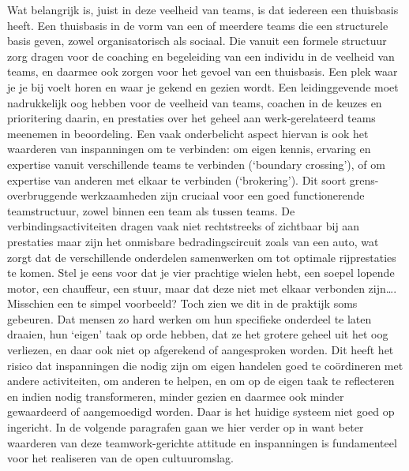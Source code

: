 \documentclass{jote-book}
\begin{document}
	Wat belangrijk is, juist in deze veelheid van teams, is dat iedereen een thuisbasis heeft. Een thuisbasis in de vorm van een of meerdere teams die een structurele basis geven, zowel organisatorisch als sociaal. Die vanuit een formele structuur zorg dragen voor de coaching en begeleiding van een individu in de veelheid van teams, en daarmee ook zorgen voor het gevoel van een thuisbasis. Een plek waar je je bij voelt horen en waar je gekend en gezien wordt. Een leidinggevende moet nadrukkelijk oog hebben voor de veelheid van teams, coachen in de keuzes en prioritering daarin, en prestaties over het geheel aan werk-gerelateerd teams meenemen in beoordeling. Een vaak onderbelicht aspect hiervan is ook het waarderen van inspanningen om te verbinden: om eigen kennis, ervaring en expertise vanuit verschillende teams te verbinden (‘boundary crossing'), of om expertise van anderen met elkaar te verbinden (‘brokering'). Dit soort grens-overbruggende werkzaamheden zijn cruciaal voor een goed functionerende teamstructuur, zowel binnen een team als tussen teams. De verbindingsactiviteiten dragen vaak niet rechtstreeks of zichtbaar bij aan prestaties maar zijn het onmisbare bedradingscircuit zoals van een auto, wat zorgt dat de verschillende onderdelen samenwerken om tot optimale rijprestaties te komen. Stel je eens voor dat je vier prachtige wielen hebt, een soepel lopende motor, een chauffeur, een stuur, maar dat deze niet met elkaar verbonden zijn…. Misschien een te simpel voorbeeld? Toch zien we dit in de praktijk soms gebeuren. Dat mensen zo hard werken om hun specifieke onderdeel te laten draaien, hun ‘eigen' taak op orde hebben, dat ze het grotere geheel uit het oog verliezen, en daar ook niet op afgerekend of aangesproken worden. Dit heeft het risico dat inspanningen die nodig zijn om eigen handelen goed te coördineren met andere activiteiten, om anderen te helpen, en om op de eigen taak te reflecteren en indien nodig transformeren, minder gezien en daarmee ook minder gewaardeerd of aangemoedigd worden. Daar is het huidige systeem niet goed op ingericht. In de volgende paragrafen gaan we hier verder op in want beter waarderen van deze teamwork-gerichte attitude en inspanningen is fundamenteel voor het realiseren van de open cultuuromslag.
\end{document}
